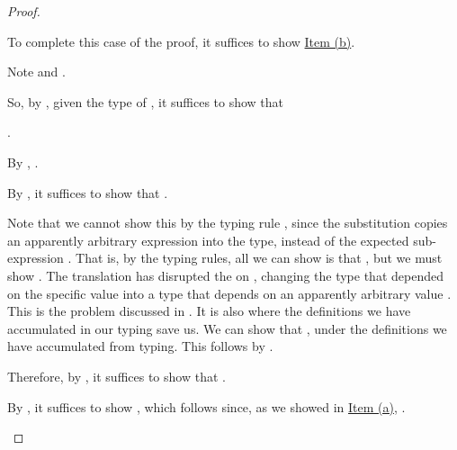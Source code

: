 {\begin{proof}
\begin{proofcases}
      To complete this case of the proof, it suffices to show
      \hyperref[prf:anf:type-pres:snd-1]{Item (b)}.

      Note \im{\edefs{\ssnde{\se}} = (\edefs{\se},\txpr=\ehole{\se})} and \im{\ehole{\ssnde{\se}} = \tsnde{\txpr}}.

      So, by , given the type of \im{\tK}, it suffices to
      show that

      \im{\styjudg{\anfh{\slenv},\edefs{\se},\txpr=\ehole{\se}}{\tsnde{\txpr}}{\anfh{\subst{\sBpr}{\sfste{\se}}{\sx}}}}.

      By , \im{\anfh{\subst{\sBpr}{\sfste{\se}}{\tx}} \equiv
      \subst{\anfh{\sBpr}}{\anfh{\sfste{\se}}}{\tx}}.

      By , it suffices to show that
      \im{\styjudg{\anfh{\slenv},\edefs{\se},\txpr=\ehole{\se}}{\tsnde{\txpr}}{\subst{\anfh{\sBpr}}{\anfh{\sfste{\se}}}{\tx}}}.

      Note that we cannot show this by the typing rule
      , since the substitution
      \im{\subst{\anfh{\sBpr}}{\anfh{\sfste{\se}}}{\tx}} copies an apparently
      arbitrary expression \im{\anfh{\sfste{\se}}} into the type, instead of the
      expected sub-expression \im{\tfste{\txpr}}.
      That is, by the typing rules, all we can show is that
      \im{\tsnde{\txpr} : \subst{\anfh{\sBpr}}{\tfste{\txpr}}{\tx}}, but we must show
      \im{\tsnde{\txpr} : \subst{\anfh{\sBpr}}{\anfh{\sfste{\se}}}{\tx}}.
      The translation has disrupted the  on \im{\se}, changing the
      type that depended on the specific value \im{\se} into a type that
      depends on an apparently arbitrary value \im{\txpr}.
      This is the problem discussed in .
      It is also where the definitions we have accumulated in our
       typing save us.
      We can show that \im{\anfh{\sfste{\se}} \equiv \tfste{\txpr}}, under
      the definitions we have accumulated from  typing.
      This follows by .

      Therefore, by , it suffices to show that
      \im{\styjudg{\anfh{\slenv},\edefs{\se},\txpr=\ehole{\se}}{\tsnde{\txpr}}{\subst{\anfh{\sBpr}}{\tfste{\txpr}}{\tx}}}.

      By , it suffices to show
      \im{\styjudg{\anfh{\slenv},\edefs{\se},\txpr=\ehole{\se}}{\txpr}{\tsigmaty{\tx}{\anfh{\sApr}}{\anfh{\sBpr}}}},
      which follows since, as we showed in
      \hyperref[prf:anf:type-pres:snd-0]{Item (a)}, \im{\anfh{\se} :
        \tsigmaty{\tx}{\anfh{\sApr}}{\anfh{\sBpr}}}.


\end{proofcases}
\end{proof}}

